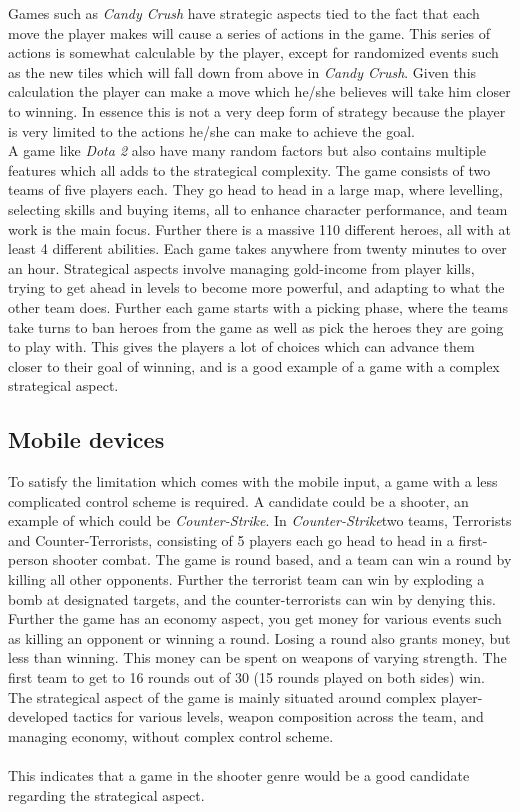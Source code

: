 Games such as \textit{Candy Crush}\cite{candycrush} have strategic aspects tied to the fact that each move the player makes will cause a series of actions in the game.
This series of actions is somewhat calculable by the player, except for randomized events such as the new tiles which will fall down from above in \textit{Candy Crush}.
Given this calculation the player can make a move which he/she believes will take him closer to winning.
In essence this is not a very deep form of strategy because the player is very limited to the actions he/she can make to achieve the goal.\\
A game like \textit{Dota 2}\cite{Dota2} also have many random factors but also contains multiple features which all adds to the strategical complexity.
The game consists of two teams of five players each. 
They go head to head in a large map, where levelling, selecting skills and buying items, all to enhance character performance, and team work is the main focus. 
Further there is a massive 110 different heroes, all with at least 4 different abilities. 
Each game takes anywhere from twenty minutes to over an hour. 
Strategical aspects involve managing gold-income from player kills, trying to get ahead in levels to become more powerful, and adapting to what the other team does. 
Further each game starts with a picking phase, where the teams take turns to ban heroes from the game as well as pick the heroes they are going to play with.
This gives the players a lot of choices which can advance them closer to their goal of winning, and is a good example of a game with a complex strategical aspect.

\subsection{Mobile devices}
To satisfy the limitation which comes with the mobile input, a game with a less complicated control scheme is required.
A candidate could be a shooter, an example of which could be \textit{Counter-Strike}. \cite{counterstrike}
In \textit{Counter-Strike}two teams, Terrorists and Counter-Terrorists, consisting of 5 players each go head to head in a first-person shooter combat. 
The game is round based, and a team can win a round by killing all other opponents. 
Further the terrorist team can win by exploding a bomb at designated targets, and the counter-terrorists can win by denying this. 
Further the game has an economy aspect, you get money for various events such as killing an opponent or winning a round.
Losing a round also grants money, but less than winning.
This money can be spent on weapons of varying strength.
The first team to get to 16 rounds out of 30 (15 rounds played on both sides) win. 
The strategical aspect of the game is mainly situated around complex player-developed tactics for various levels, weapon composition across the team, and managing economy, without complex control scheme.\\\\
This indicates that a game in the shooter genre would be a good candidate regarding the strategical aspect.